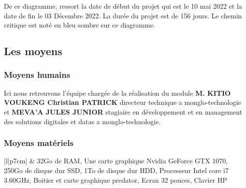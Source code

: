 De ce diagramme, ressort la date de début du projet qui est le 10 mai 2022 et la date de fin le 03 Décembre 2022. La durée du projet est de 156 jours. Le chemin critique est noté en bleu sombre sur ce diagramme.

\subsection{Les moyens}

\subsubsection{Moyens humains}

Ici nous retrouvons l'équipe chargée de la réalisation du module \textbf{M. KITIO VOUKENG Christian PATRICK} directeur technique a monglo-technologie et \textbf{MEVA’A JULES JUNIOR} stagiaire en développement et en management des solutions digitales et datas a monglo-technologie.

\subsubsection{Moyens matériels}

\begin{table}[H]
	\centering
	\caption{Moyens matériels}
	\label{tab:my-table}
	\begin{tabular}{|l|p{7cm}|}
		\hline
		 & 32Go de RAM, Une carte graphique Nvidia GeForce GTX 1070, 250Go de disque dur SSD, 1To de disque dur HDD, Processeur Intel core i7 3.60GHz, Boitier et carte graphique predator, Ecran 32 pouces, Clavier HP \\ \hline
		                                                                                                                                                                                                         \\ \hline
		                                                                                                                                                                                                                      \\ \hline
		                                                                                                                                                                                                                      \\ \hline
	\end{tabular}
\end{table}

